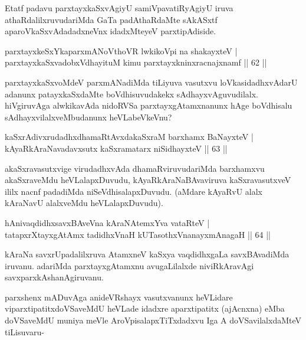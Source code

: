 \begin{artha}
Etatf padavu parxtayxkaSxvAgiyU samiVpavatiRyAgiyU iruva athaRdalilxruvudariMda GaTa padAthaRdaMte sAkASxtf aparoVkaSxvAdadadxneVnx idadxMteyeV parxtipAdiside.
\end{artha}


\begin{shl}
parxtayxkeSxYkaparxmANoV\s thoVR lwkikoV\s pi na shakayxteV |\\
parxtayxkaSxvadobxVdhayituM kimu parxtayxkninxracnajxnamf \hfill || 62 ||
\end{shl}

\begin{artha}
parxtayxkaSxvoMdeV parxmANadiMda tiLiyuva vasutxvu loVkasidadhxvAdarU adanunx patayxkaSxdaMte boVdhisuvudakekx sAdhayxvAguvudilalx. hiVgiruvAga alwkikavAda nidoRVSa parxtayxgAtamxnanunx hAge boVdhisalu sAdhayxvilalxveMbudanunx heVLabeVkeVnu? 
\end{artha}


\begin{shl}
kaSxrAdivxrudadhxdhamaRtAvxdakaSxraM barxhamx BaNayxteV |\\
kAyaRkAraNavadavxsutx kaSxramatarx niSidhayxteV \hfill || 63 ||
\end{shl}

\begin{artha}
akaSxravasutxvige virudadhxvAda dhamaRviruvudariMda barxhamxvu akaSxraveMdu heVLalapxDuvudu, kAyaRkAraNaBAvaviruva kaSxravasutxveV ililx nacnf padadiMda niSeVdhisalapxDuvudu. (aMdare kAyaRvU alalx kAraNavU alalxveMdu heVLalapxDuvudu).
\end{artha}


\begin{shl}
hAnivaqdidhxsavxBAveVna kAraNAtemxYva vataRteV |\\
tatapxrXtayxgAtAmx tadidhxVnaH kUTasothxV\s nanayxmAnagaH \hfill || 64 ||
\end{shl}

\begin{artha}
kAraNa savxrUpadalilxruva AtamxneV kaSxya vaqdidhxgaLa savxBAvadiMda iruvanu. adariMda parxtayxgAtamxnu avugaLilalxde niviRkAravAgi savxparxkAshanAgiruvanu.

parxshenx mADuvAga anideVRshayx vasutxvanunx heVLidare viparxtipatitxdoVSaveMdU heVLade idadxre aparxtipatitx (ajAcnxna) eMba doVSaveMdU muniya meVle AroVpisalapxTiTxdadxvu Iga A doVSavilalxdaMteV tiLisuvaru-
\end{artha}

